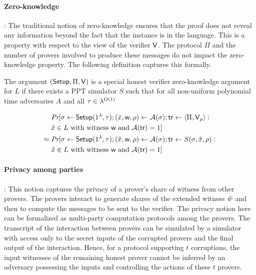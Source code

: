 \paragraph{Zero-knowledge}: 
The traditional notion of zero-knowledge ensures that the proof does not reveal any information beyond the fact that the instance is in the language.
This is a property with respect to the view of the verifier $\mathsf{V}$. The protocol $\Pi$ and the number of provers involved to produce these messages do not impact the zero-knowledge property. The following definition captures this formally.
\begin{definition}
The argument $(\mathsf{Setup}, \Pi, \mathsf{V})$ is a special honest verifier zero-knowledge argument for $L$ if there exists a PPT simulator $S$ such that for all non-uniform polynomial time adversaries $A$ and all $\tau \in {\lambda}^{O(1)}$ 

\begin{align*}
&\text{\em Pr} [\sigma \leftarrow \mathsf{Setup}(1^{\lambda}, \tau); (\hat{x} ,\mathsf{w} ,\rho) \leftarrow \mathcal{A}(\sigma); \mathsf{tr} \leftarrow \langle \Pi, \mathsf{V}_\rho \rangle:\\
 &\hat{x} \in L \text{ with witness } \mathsf{w} \text{ and } \mathcal{A}(\mathsf{tr})=1 ]\\
\approx \; &\text{\em Pr} [\sigma \leftarrow \mathsf{Setup}(1^{\lambda}, \tau); (\hat{x},\mathsf{w},\rho) \leftarrow \mathcal{A}(\sigma); \mathsf{tr} \leftarrow S(\sigma,\hat{x},\rho):\\ &\hat{x} \in L \text{ with witness } \mathsf{w} \text{ and } \mathcal{A}(\mathsf{tr}) = 1 ]
\end{align*}
\end{definition}

\paragraph{Privacy among parties}:
This notion captures the privacy of a prover's share of witness from other provers. The provers interact to generate shares of the extended witness $\hat{w}$ and then to compute the messages to be sent to the verifier. The privacy notion here can be formalized as multi-party computation protocols among the provers. The transcript of the interaction between provers can be simulated by a simulator with access only to the secret inputs of the corrupted provers and the final output of the interaction. Hence, for a protocol supporting $t$ corruptions, the input witnesses of the remaining honest prover cannot be inferred by an adversary possessing the inputs and controlling the actions of these $t$ provers.

